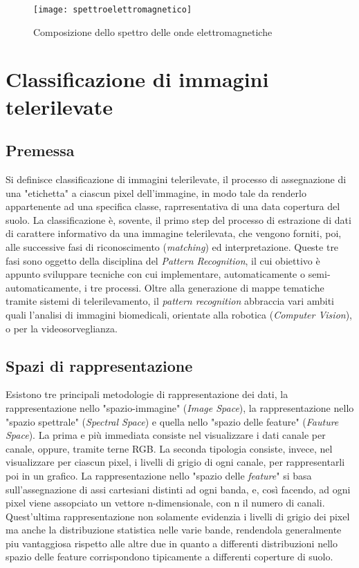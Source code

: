  \begin{figure}[!ht]
   \center
      \texttt{[image: spettroelettromagnetico]}
    \caption{Composizione dello spettro delle onde elettromagnetiche}
    \label{fig:spettroelettromagnetico}
  \end{figure}
\clearpage




\section{Classificazione di immagini telerilevate}

\subsection{Premessa}

Si definisce classificazione di immagini telerilevate, il processo di assegnazione di una "etichetta" a ciascun pixel dell'immagine, in modo tale da renderlo appartenente ad una specifica classe, raprresentativa di una data copertura del suolo.
La classificazione è, sovente, il primo step del processo di estrazione di dati di carattere informativo da una immagine telerilevata, che vengono forniti, poi, alle successive fasi di riconoscimento (\emph{matching}) ed interpretazione. 
Queste tre fasi sono oggetto della disciplina del \emph{Pattern Recognition}, il cui obiettivo è appunto sviluppare tecniche con cui implementare, automaticamente o semi-automaticamente, i tre processi.
Oltre alla generazione di mappe tematiche tramite sistemi di telerilevamento, il \emph{pattern recognition} abbraccia vari ambiti quali l'analisi di immagini biomedicali, orientate alla robotica (\emph{Computer Vision}), o per la videosorveglianza.   


\subsection{Spazi di rappresentazione}

Esistono tre principali metodologie di rappresentazione dei dati, la rappresentazione nello "spazio-immagine" (\emph{Image Space}), la rappresentazione nello "spazio spettrale" (\emph{Spectral Space}) e quella nello "spazio delle feature" (\emph{Fauture Space}). La prima e più immediata consiste nel visualizzare i dati canale per canale, oppure, tramite terne RGB. La seconda tipologia consiste, invece, nel visualizzare per ciascun pixel, i livelli di grigio di ogni canale, per rappresentarli poi in un grafico. La rappresentazione nello "spazio delle \emph{feature}" si basa sull'assegnazione di assi cartesiani distinti ad ogni banda, e, così facendo, ad ogni pixel viene assopciato un vettore n-dimensionale, con n il numero di canali. Quest'ultima rappresentazione non solamente evidenzia i livelli di grigio dei pixel ma anche la distribuzione statistica nelle varie bande, rendendola generalmente piu vantaggiosa rispetto alle altre due in quanto a differenti distribuzioni nello spazio delle feature corrispondono tipicamente a differenti coperture di suolo.  

